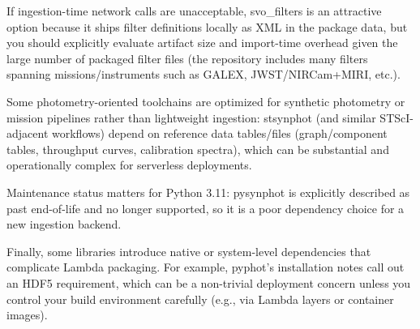 \documentclass[twocolumn]{aastex701}
\begin{document}
If ingestion-time network calls are unacceptable, svo\_filters is an attractive option because it ships filter definitions locally as XML in the package data, but you should explicitly evaluate artifact size and import-time overhead given the large number of packaged filter files (the repository includes many filters spanning missions/instruments such as GALEX, JWST/NIRCam+MIRI, etc.). \citep{ref45}

Some photometry-oriented toolchains are optimized for synthetic photometry or mission pipelines rather than lightweight ingestion: stsynphot (and similar STScI-adjacent workflows) depend on reference data tables/files (graph/component tables, throughput curves, calibration spectra), which can be substantial and operationally complex for serverless deployments. \citep{ref46}

Maintenance status matters for Python 3.11: pysynphot is explicitly described as past end-of-life and no longer supported, so it is a poor dependency choice for a new ingestion backend. \citep{ref47}

Finally, some libraries introduce native or system-level dependencies that complicate Lambda packaging. For example, pyphot’s installation notes call out an HDF5 requirement, which can be a non-trivial deployment concern unless you control your build environment carefully (e.g., via Lambda layers or container images). \citep{ref48}



\end{document}
